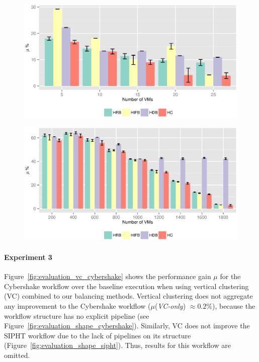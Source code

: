 \begin{figure}[!htb]
	\centering
	\includegraphics[width=1.0\linewidth]{figure23.eps}
	\label{fig:evaluation_resource_2}
\end{figure}

\begin{figure}[!htb]
	\centering
	\includegraphics[width=1.0\linewidth]{figure28.eps}
	\label{fig:evaluation_resource_3}
\end{figure}

\paragraph{\textbf{Experiment 3}}
Figure~\ref{fig:evaluation_vc_cybershake} shows the performance gain $\mu$ for the Cybershake workflow over the baseline execution when using vertical clustering (VC) combined to our balancing methods. Vertical clustering does not aggregate any improvement to the Cybershake workflow ($\mu$(\emph{VC-only}) $\approx 0.2\%$), because the workflow structure has no explicit pipeline (see Figure~\ref{fig:evaluation_shape_cybershake}). Similarly, VC does not improve the SIPHT workflow due to the lack of pipelines on its structure (Figure~\ref{fig:evaluation_shape_sipht}). Thus, results for this workflow are omitted.

